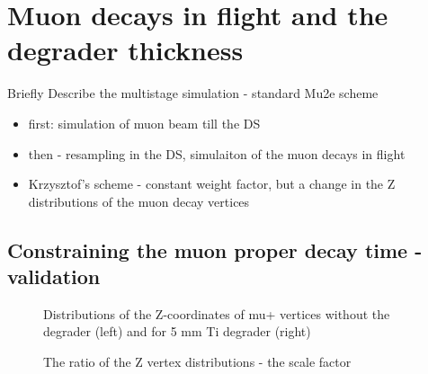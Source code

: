 \section {Muon decays in flight and the degrader thickness}

{\red Briefly Describe the multistage simulation - standard Mu2e scheme
  \begin{itemize}
  \item
    first: simulation of muon beam till the DS
  \item
    then - resampling in the DS, simulaiton of the muon decays in flight
  \item
    Krzysztof's scheme - constant weight factor, but a change in the Z distributions
    of the muon decay vertices
  \end{itemize}
}


\subsection {Constraining the muon proper decay time - validation}

\begin{figure}[H]
  \caption{
    \label{fig:pion_stop_time}
    Distributions of the Z-coordinates of mu+ vertices without the degrader (left)
    and for 5 mm Ti degrader (right)
  }
\end{figure}

\begin{figure}[H]
  \caption{
    \label{fig:pion_stop_time}
    The ratio of the Z vertex distributions - the scale factor
  }
\end{figure}


